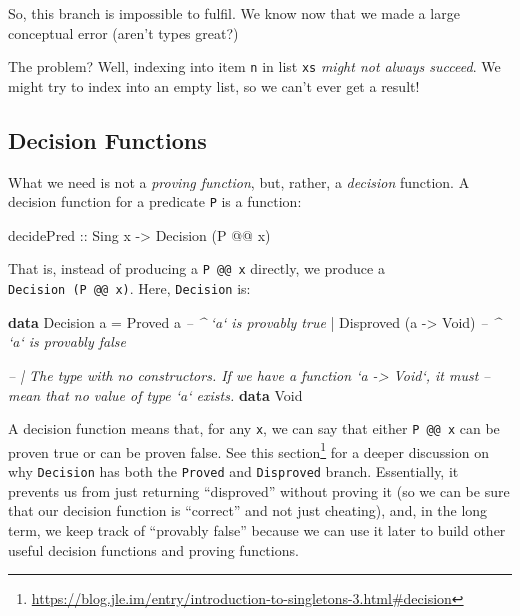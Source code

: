\documentclass[]{article}
\newenvironment{Shaded}{}{}
\newcommand{\CommentTok}[1]{\textcolor[rgb]{0.38,0.63,0.69}{\textit{#1}}}
\newcommand{\DataTypeTok}[1]{\textcolor[rgb]{0.56,0.13,0.00}{#1}}
\newcommand{\FunctionTok}[1]{\textcolor[rgb]{0.02,0.16,0.49}{#1}}
\newcommand{\KeywordTok}[1]{\textcolor[rgb]{0.00,0.44,0.13}{\textbf{#1}}}
\newcommand{\NormalTok}[1]{#1}
\newcommand{\OtherTok}[1]{\textcolor[rgb]{0.00,0.44,0.13}{#1}}
\renewcommand{\href}[2]{#2\footnote{\url{#1}}}
\begin{document}
So, this branch is impossible to fulfil. We know now that we made a large
conceptual error (aren't types great?)

The problem? Well, indexing into item \texttt{n} in list \texttt{xs} \emph{might
not always succeed}. We might try to index into an empty list, so we can't ever
get a result!

\hypertarget{decision-functions}{%
\subsection{Decision Functions}\label{decision-functions}}

What we need is not a \emph{proving function}, but, rather, a \emph{decision}
function. A decision function for a predicate \texttt{P} is a function:

\begin{Shaded}
\begin{Highlighting}[]
\OtherTok{decidePred ::} \DataTypeTok{Sing}\NormalTok{ x}
           \OtherTok{->} \DataTypeTok{Decision}\NormalTok{ (}\DataTypeTok{P} \FunctionTok{@@}\NormalTok{ x)}
\end{Highlighting}
\end{Shaded}

That is, instead of producing a \texttt{P\ @@\ x} directly, we produce a
\texttt{Decision\ (P\ @@\ x)}. Here, \texttt{Decision} is:

\begin{Shaded}
\begin{Highlighting}[]
\KeywordTok{data} \DataTypeTok{Decision}\NormalTok{ a}
    \FunctionTok{=} \DataTypeTok{Proved}\NormalTok{     a                }\CommentTok{-- ^ `a` is provably true}
    \FunctionTok{|} \DataTypeTok{Disproved}\NormalTok{ (a }\OtherTok{->} \DataTypeTok{Void}\NormalTok{)       }\CommentTok{-- ^ `a` is provably false}

\CommentTok{-- | The type with no constructors.  If we have a function `a -> Void`, it must}
\CommentTok{-- mean that no value of type `a` exists.}
\KeywordTok{data} \DataTypeTok{Void}
\end{Highlighting}
\end{Shaded}

A decision function means that, for any \texttt{x}, we can say that either
\texttt{P\ @@\ x} can be proven true or can be proven false. See
\href{https://blog.jle.im/entry/introduction-to-singletons-3.html\#decision}{this
section} for a deeper discussion on why \texttt{Decision} has both the
\texttt{Proved} and \texttt{Disproved} branch. Essentially, it prevents us from
just returning ``disproved'' without proving it (so we can be sure that our
decision function is ``correct'' and not just cheating), and, in the long term,
we keep track of ``provably false'' because we can use it later to build other
useful decision functions and proving functions.
\end{document}
